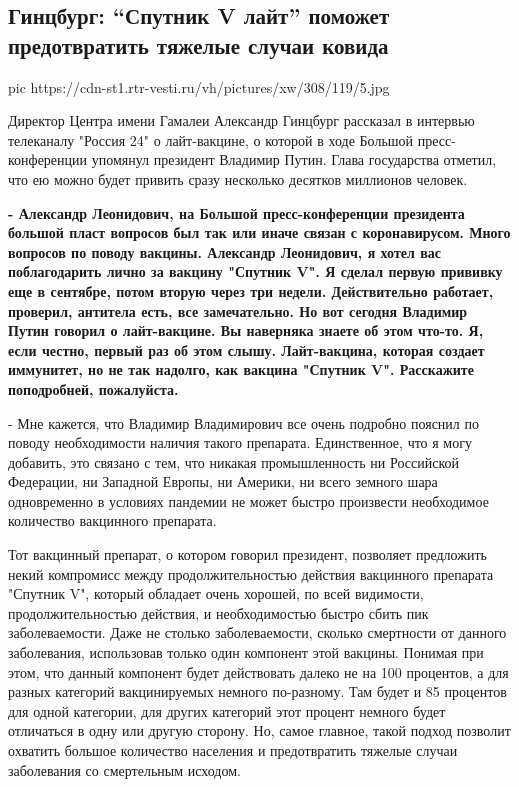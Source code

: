  
 
 
 
 
 
\subsection{Гинцбург: \enquote{Спутник V лайт} поможет предотвратить тяжелые случаи ковида}
\label{sec:17_12_2020.news.ru.vesti.2.ginzburg_sputnik_lait}

\ifcmt
pic https://cdn-st1.rtr-vesti.ru/vh/pictures/xw/308/119/5.jpg
\fi

Директор Центра имени Гамалеи Александр Гинцбург рассказал в интервью
телеканалу "Россия 24" о лайт-вакцине, о которой в ходе Большой
пресс-конференции упомянул президент Владимир Путин. Глава государства отметил,
что ею можно будет привить сразу несколько десятков миллионов человек.

\textbf{- Александр Леонидович, на Большой пресс-конференции президента большой пласт
вопросов был так или иначе связан с коронавирусом. Много вопросов по поводу
вакцины. Александр Леонидович, я хотел вас поблагодарить лично за вакцину
"Спутник V". Я сделал первую прививку еще в сентябре, потом вторую через три
недели. Действительно работает, проверил, антитела есть, все замечательно. Но
вот сегодня Владимир Путин говорил о лайт-вакцине. Вы наверняка знаете об этом
что-то. Я, если честно, первый раз об этом слышу. Лайт-вакцина, которая создает
иммунитет, но не так надолго, как вакцина "Спутник V". Расскажите поподробней,
пожалуйста.}

- Мне кажется, что Владимир Владимирович все очень подробно пояснил по поводу
необходимости наличия такого препарата. Единственное, что я могу добавить, это
связано с тем, что никакая промышленность ни Российской Федерации, ни Западной
Европы, ни Америки, ни всего земного шара одновременно в условиях пандемии не
может быстро произвести необходимое количество вакцинного препарата.

Тот вакцинный препарат, о котором говорил президент, позволяет предложить некий
компромисс между продолжительностью действия вакцинного препарата "Спутник V",
который обладает очень хорошей, по всей видимости, продолжительностью действия,
и необходимостью быстро сбить пик заболеваемости. Даже не столько
заболеваемости, сколько смертности от данного заболевания, использовав только
один компонент этой вакцины. Понимая при этом, что данный компонент будет
действовать далеко не на 100 процентов, а для разных категорий вакцинируемых
немного по-разному. Там будет и 85 процентов для одной категории, для других
категорий этот процент немного будет отличаться в одну или другую сторону. Но,
самое главное, такой подход позволит охватить большое количество населения и
предотвратить тяжелые случаи заболевания со смертельным исходом.

